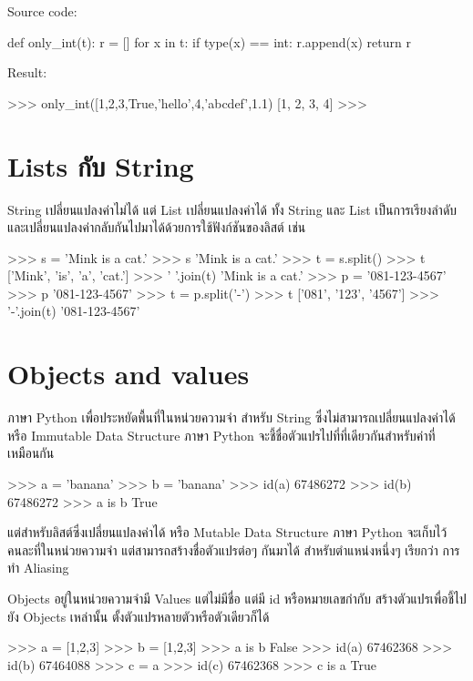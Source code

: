 Source code:
\begin{codelist}{}{}
def only_int(t):
    r = []
    for x in t:
        if type(x) == int: r.append(x)
    return r
\end{codelist}

Result:
\begin{codelist}{}{}
>>> only_int([1,2,3,True,'hello',4,'abcdef',1.1)
[1, 2, 3, 4]
>>>
\end{codelist}

\section{Lists กับ String}

String เปลี่ยนแปลงค่าไม่ได้ แต่ List เปลี่ยนแปลงค่าได้ ทั้ง String และ List เป็นการเรียงลำดับและเปลี่ยนแปลงค่ากลับกันไปมาได้ด้วยการใช้ฟังก์ชันของลิสต์ เช่น 

\begin{codelist}{}{}
>>> s = 'Mink is a cat.'
>>> s
'Mink is a cat.'
>>> t = s.split()
>>> t
['Mink', 'is', 'a', 'cat.']
>>> ' '.join(t)
'Mink is a cat.'
>>> p = '081-123-4567'
>>> p
'081-123-4567'
>>> t = p.split('-')
>>> t
['081', '123', '4567']
>>> '-'.join(t)
'081-123-4567'
\end{codelist}


\section{Objects and values}

ภาษา Python เพื่อประหยัดพื้นที่ในหน่วยความจำ สำหรับ String ซึ่งไม่สามารถเปลี่ยนแปลงค่าได้ หรือ Immutable Data Structure ภาษา Python จะชี้ชื่อตัวแปรไปที่ที่เดียวกันสำหรับค่าที่เหมือนกัน 

\begin{codelist}{}{}
>>> a = 'banana'
>>> b = 'banana'
>>> id(a)
67486272
>>> id(b)
67486272
>>> a is b
True
\end{codelist}


แต่สำหรับลิสต์ซึ่งเปลี่ยนแปลงค่าได้ หรือ Mutable Data Structure ภาษา Python จะเก็บไว้คนละที่ในหน่วยความจำ แต่สามารถสร้างชื่อตัวแปรต่อๆ กันมาได้ สำหรับตำแหน่งหนึ่งๆ เรียกว่า การทำ Aliasing

Objects อยู่ในหน่วยความจำมี Values แต่ไม่มีชื่อ แต่มี id หรือหมายเลขกำกับ สร้างตัวแปรเพื่อชี้ไปยัง Objects เหล่านั้น ตั้งตัวแปรหลายตัวหรือตัวเดียวก็ได้

\begin{codelist}{}{}
>>> a = [1,2,3]
>>> b = [1,2,3]
>>> a is b
False
>>> id(a)
67462368
>>> id(b)
67464088
>>> c = a
>>> id(c)
67462368
>>> c is a
True
\end{codelist}


